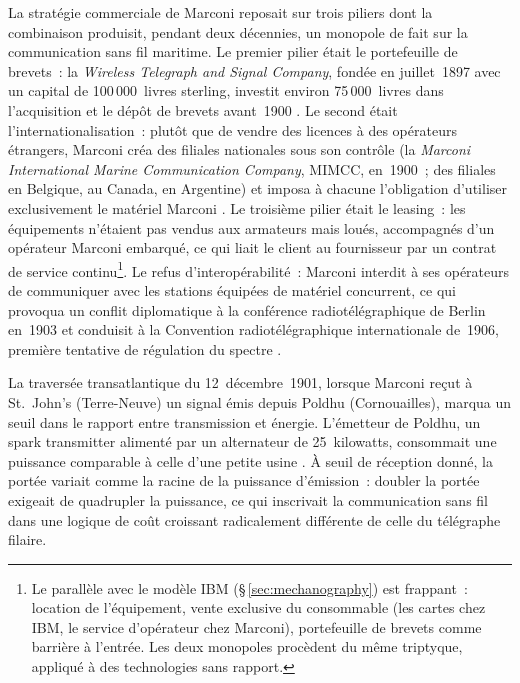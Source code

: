 %
La stratégie commerciale de Marconi reposait sur trois piliers dont la combinaison produisit, pendant deux décennies, un monopole de fait sur la communication sans fil maritime. Le premier pilier était le portefeuille de brevets~: la \emph{Wireless Telegraph and Signal Company}, fondée en juillet~1897 avec un capital de 100\,000~livres sterling, investit environ 75\,000~livres dans l'acquisition et le dépôt de brevets avant~1900 \parencite{kooij_information_2022}. Le second était l'internationalisation~: plutôt que de vendre des licences à des opérateurs étrangers, Marconi créa des filiales nationales sous son contrôle (la \emph{Marconi International Marine Communication Company}, MIMCC, en~1900~; des filiales en Belgique, au Canada, en Argentine) et imposa à chacune l'obligation d'utiliser exclusivement le matériel Marconi \parencite{jolly_marconi_1972, kooij_information_2022}. Le troisième pilier était le leasing~: les équipements n'étaient pas vendus aux armateurs mais loués, accompagnés d'un opérateur Marconi embarqué, ce qui liait le client au fournisseur par un contrat de service continu\footnote{Le parallèle avec le modèle IBM (§\,\ref{sec:mechanography}) est frappant~: location de l'équipement, vente exclusive du consommable (les cartes chez IBM, le service d'opérateur chez Marconi), portefeuille de brevets comme barrière à l'entrée. Les deux monopoles procèdent du même triptyque, appliqué à des technologies sans rapport.}. Le refus d'interopérabilité~: Marconi interdit à ses opérateurs de communiquer avec les stations équipées de matériel concurrent, ce qui provoqua un conflit diplomatique à la conférence radiotélégraphique de Berlin en~1903 et conduisit à la Convention radiotélégraphique internationale de~1906, première tentative de régulation du spectre \parencite{jolly_marconi_1972, headrick_invisible_1991}.

%
La traversée transatlantique du 12~décembre~1901, lorsque Marconi reçut à St.~John's (Terre-Neuve) un signal émis depuis Poldhu (Cornouailles), marqua un seuil dans le rapport entre transmission et énergie. L'émetteur de Poldhu, un spark transmitter alimenté par un alternateur de 25~kilowatts, consommait une puissance comparable à celle d'une petite usine \parencite{jolly_marconi_1972, aitken_continuous_1985}. À seuil de réception donné, la portée variait comme la racine de la puissance d'émission~: doubler la portée exigeait de quadrupler la puissance, ce qui inscrivait la communication sans fil dans une logique de coût croissant radicalement différente de celle du télégraphe filaire.

